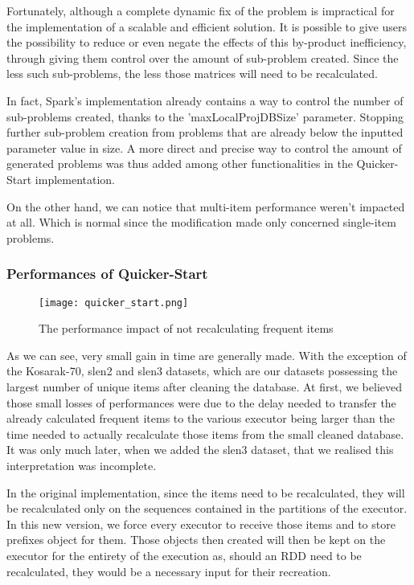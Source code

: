 \documentclass{eplmastersthesis}
\begin{document}
\begin{enumerate}
Fortunately, although a complete dynamic fix of the problem is impractical for the implementation of a scalable and efficient solution. It is possible to give users the possibility to reduce or even negate the effects of this by-product inefficiency, through giving them control over the amount of sub-problem created. Since the less such sub-problems, the less those matrices will need to be recalculated. \newline

In fact, Spark's implementation already contains a way to control the number of sub-problems created, thanks to the 'maxLocalProjDBSize' parameter. Stopping further sub-problem creation from problems that are already below the inputted parameter value in size. A more direct and precise way to control the amount of generated problems was thus added among other functionalities in the Quicker-Start implementation.

\end{enumerate}

On the other hand, we can notice that multi-item performance weren't impacted at all. Which is normal since the modification made only concerned single-item problems. \newline

\subsubsection{Performances of Quicker-Start}

\begin{figure}[h]
  \centering
  \texttt{[image: quicker\_start.png]}
  \caption{The performance impact of not recalculating frequent items}
  \label{fig:new_functionalities_perf}
\end{figure}

As we can see, very small gain in time are generally made. With the exception of the Kosarak-70, slen2 and slen3 datasets, which are our datasets possessing the largest number of unique items after cleaning the database. At first, we believed those small losses of performances were due to the delay needed to transfer the already calculated frequent items to the various executor being larger than the time needed to actually recalculate those items from the small cleaned database. It was only much later, when we added the slen3 dataset, that we realised this interpretation was incomplete.\newline

In the original implementation, since the items need to be recalculated, they will be recalculated only on the sequences contained in the partitions of the executor. In this new version, we force every executor to receive those items and to store prefixes object for them. Those objects then created will then be kept on the executor for the entirety of the execution as, should an RDD need to be recalculated, they would be a necessary input for their recreation. \newline
\end{document}
